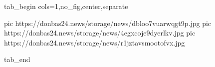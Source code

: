  
 
 
 
 

\ifcmt
  tab_begin cols=1,no_fig,center,separate

     pic https://donbas24.news/storage/news/dbloo7vuarwqgt9p.jpg
		 pic https://donbas24.news/storage/news/4egxcoje9dyerlkv.jpg
		 pic https://donbas24.news/storage/news/r1jztavsmootofvx.jpg

  tab_end
\fi
